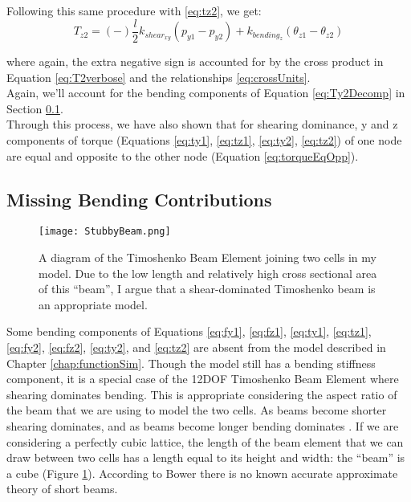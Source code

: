 {Following this same procedure with \ref{eq:tz2}, we get:
\[  T_{z2} =  (-)\dfrac{l}{2}k_{shear_{xy}}(p_{y1} - p_{y2}) + k_{bending_z}(\theta_{z1}  - \theta_{z2}) \]

where again, the extra negative sign is accounted for by the cross product in Equation \ref{eq:T2verbose} and the relationships \ref{eq:crossUnits}.\\

Again, we'll account for the bending components of Equation \ref{eq:Ty2Decomp} in Section \ref{sec:bendingdominance}.\\

Through this process, we have also shown that for shearing dominance, y and z components of torque (Equations \ref{eq:ty1}, \ref{eq:tz1}, \ref{eq:ty2}, \ref{eq:tz2}) of one node are equal and opposite to the other node (Equation \ref{eq:torqueEqOpp}).

\subsection{Missing Bending Contributions}\label{sec:bendingdominance}

\begin{figure}
  \texttt{[image: StubbyBeam.png]}
  \caption{A diagram of the Timoshenko Beam Element joining two cells in my model.  Due to the low length and relatively high cross sectional area of this ``beam'', I argue that a shear-dominated Timoshenko beam is an appropriate model.}
  \label{fig:StubbyBeam}
\end{figure}

Some bending components of Equations \ref{eq:fy1}, \ref{eq:fz1}, \ref{eq:ty1}, \ref{eq:tz1}, \ref{eq:fy2}, \ref{eq:fz2}, \ref{eq:ty2},  and \ref{eq:tz2} are absent from the model described in Chapter \ref{chap:functionSim}.  Though the model still has a bending stiffness component, it is a special case of the 12DOF Timoshenko Beam Element where shearing dominates bending.  This is appropriate considering the aspect ratio of the beam that we are using to model the two cells.  As beams become shorter shearing dominates, and as beams become longer bending dominates \cite{Bower2009}.  If we are considering a perfectly cubic lattice, the length of the beam element that we can draw between two cells has a length equal to its height and width: the ``beam'' is a cube (Figure \ref{fig:StubbyBeam}).  According to Bower \cite{Bower2009} there is no known accurate approximate theory of short beams.

}
